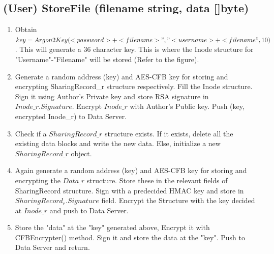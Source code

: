 \documentclass[a4paper, 12pt]{scrartcl}
\begin{document}
\subsection{(User) StoreFile (filename string, data []byte)}
\begin{enumerate}
	\itemsep0em
	\item Obtain $key = Argon2Key(<password>+<filename>", "<username>+<filename", 10)$. This will generate a 36 character key. This is where the Inode structure for "Username"-"Filename" will be stored (Refer to the figure).
	\item Generate a random address (key) and AES-CFB key for storing and encrypting SharingRecord\_r structure respectively. Fill the Inode structure. Sign it using Author's Private key and store RSA signature in $Inode\_r.Signature$. Encrypt $Inode\_r$ with Author's Public key. Push (key, encrypted Inode\_r) to Data Server.
	\item Check if a $SharingRecord\_r$ structure exists. If it exists, delete all the existing data blocks and write the new data. Else, initialize a new $SharingRecord\_r$ object.
	\item Again generate a random address (key) and AES-CFB key for storing and encrypting the $Data\_r$ structure. Store these in the relevant fields of SharingRecord structure. Sign with a predecided HMAC key and store in $SharingRecord_r.Signature$ field. Encrypt the Structure with the key decided at $Inode\_r$ and push to Data Server.
	\item Store the "data" at the "key" generated above, Encrypt it with CFBEncrypter() method. Sign it and store the data at the "key". Push to Data Server and return. 
\end{enumerate}
\end{document}
